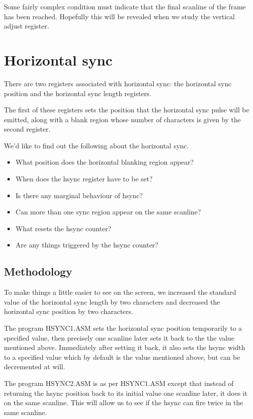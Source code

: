 \documentclass[a4paper,10pt]{amsart}
\begin{document}
Some fairly complex condition must indicate that the final scanline of the
frame has been reached. Hopefully this will be revealed when we study the
vertical adjust register.

\section{Horizontal sync}

There are two registers associated with horizontal sync: the horizontal sync
position and the horizontal sync length registers.

The first of these registers sets the position that the horizontal sync pulse
will be emitted, along with a blank region whose number of characters is given
by the second register.

We'd like to find out the following about the horizontal sync.

\begin{itemize}
\item What position does the horizontal blanking region appear?
\item When does the hsync register have to be set?
\item Is there any marginal behaviour of hsync?
\item Can more than one sync region appear on the same scanline?
\item What resets the hsync counter?
\item Are any things triggered by the hsync counter?
\end{itemize}

\subsection{Methodology}

To make things a little easier to see on the screen, we increased the
standard value of the horizontal sync length by two characters and decreased
the horizontal sync position by two characters.

The program HSYNC1.ASM sets the horizontal sync position temporarily to a
specified value, then precisely one scanline later sets it back to the the
value mentioned above. Immediately after setting it back, it also sets the
hsync width to a specified value which by default is the value mentioned above,
but can be decremented at will.

The program HSYNC2.ASM is as per HSYNC1.ASM except that instead of returning
the hsync position back to its initial value one scanline later, it does it
on the same scanline. This will allow us to see if the hsync can fire twice in
the same scanline.
\end{document}
